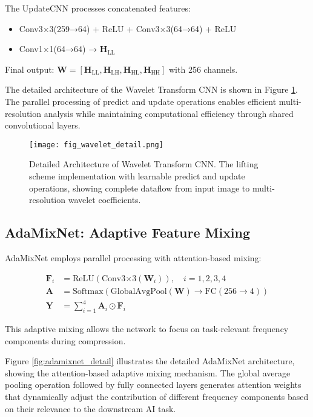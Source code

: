 \documentclass[conference]{IEEEtran}
\begin{document}
The UpdateCNN processes concatenated features:
\begin{itemize}
\item Conv3×3(259→64) + ReLU + Conv3×3(64→64) + ReLU
\item Conv1×1(64→64) → $\mathbf{H}_{\text{LL}}$
\end{itemize}

Final output: $\mathbf{W} = [\mathbf{H}_{\text{LL}}, \mathbf{H}_{\text{LH}}, \mathbf{H}_{\text{HL}}, \mathbf{H}_{\text{HH}}]$ with 256 channels.

The detailed architecture of the Wavelet Transform CNN is shown in Figure \ref{fig:wavelet_detail}. The parallel processing of predict and update operations enables efficient multi-resolution analysis while maintaining computational efficiency through shared convolutional layers.

\begin{figure}[htbp]
\centering
\texttt{[image: fig\_wavelet\_detail.png]}
\caption{Detailed Architecture of Wavelet Transform CNN. The lifting scheme implementation with learnable predict and update operations, showing complete dataflow from input image to multi-resolution wavelet coefficients.}
\label{fig:wavelet_detail}
\end{figure}

\subsection{AdaMixNet: Adaptive Feature Mixing}

AdaMixNet employs parallel processing with attention-based mixing:

\begin{align}
\mathbf{F}_i &= \text{ReLU}(\text{Conv3×3}(\mathbf{W}_i)), \quad i = 1, 2, 3, 4 \\
\mathbf{A} &= \text{Softmax}(\text{GlobalAvgPool}(\mathbf{W}) \to \text{FC}(256 \to 4)) \\
\mathbf{Y} &= \sum_{i=1}^{4} \mathbf{A}_i \odot \mathbf{F}_i
\end{align}

This adaptive mixing allows the network to focus on task-relevant frequency components during compression.

Figure \ref{fig:adamixnet_detail} illustrates the detailed AdaMixNet architecture, showing the attention-based adaptive mixing mechanism. The global average pooling operation followed by fully connected layers generates attention weights that dynamically adjust the contribution of different frequency components based on their relevance to the downstream AI task.
\end{document}
